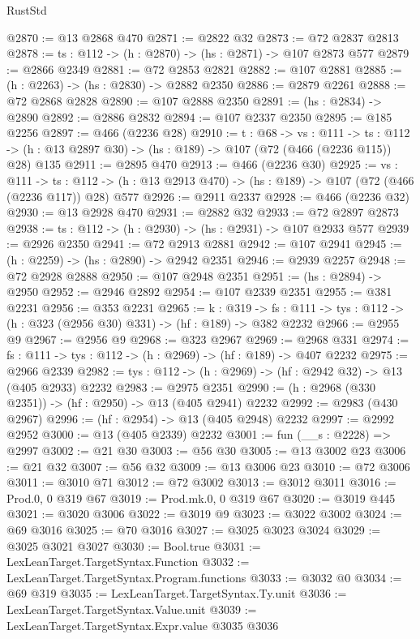 \begin{lexlean}{RustStd}
\begin{coremodule}
{\begin{coremodule}
{{{{@2870 := @13 @2868 @470
@2871 := @2822 @32
@2873 := @72 @2837 @2813
@2878 := {ts : @112} -> (h : @2870) -> (hs : @2871) -> @107 @2873 @577
@2879 := @2866 @2349
@2881 := @72 @2853 @2821
@2882 := @107 @2881
@2885 := (h : @2263) -> (hs : @2830) -> @2882 @2350
@2886 := @2879 @2261
@2888 := @72 @2868 @2828
@2890 := @107 @2888 @2350
@2891 := (hs : @2834) -> @2890
@2892 := @2886 @2832
@2894 := @107 @2337 @2350
@2895 := @185 @2256
@2897 := @466 (@2236 @28)
@2910 := {t : @68} ->
  {vs : @111} ->
  {ts : @112} -> (h : @13 @2897 @30) -> (hs : @189) -> @107 (@72 (@466 (@2236 @115)) @28) @135
@2911 := @2895 @470
@2913 := @466 (@2236 @30)
@2925 := {vs : @111} ->
  {ts : @112} -> (h : @13 @2913 @470) -> (hs : @189) -> @107 (@72 (@466 (@2236 @117)) @28) @577
@2926 := @2911 @2337
@2928 := @466 (@2236 @32)
@2930 := @13 @2928 @470
@2931 := @2882 @32
@2933 := @72 @2897 @2873
@2938 := {ts : @112} -> (h : @2930) -> (hs : @2931) -> @107 @2933 @577
@2939 := @2926 @2350
@2941 := @72 @2913 @2881
@2942 := @107 @2941
@2945 := (h : @2259) -> (hs : @2890) -> @2942 @2351
@2946 := @2939 @2257
@2948 := @72 @2928 @2888
@2950 := @107 @2948 @2351
@2951 := (hs : @2894) -> @2950
@2952 := @2946 @2892
@2954 := @107 @2339 @2351
@2955 := @381 @2231
@2956 := @353 @2231
@2965 := {k : @319} ->
  {fs : @111} -> {tys : @112} -> (h : @323 (@2956 @30) @331) -> (hf : @189) -> @382 @2232
@2966 := @2955 @9
@2967 := @2956 @9
@2968 := @323 @2967
@2969 := @2968 @331
@2974 := {fs : @111} -> {tys : @112} -> (h : @2969) -> (hf : @189) -> @407 @2232
@2975 := @2966 @2339
@2982 := {tys : @112} -> (h : @2969) -> (hf : @2942 @32) -> @13 (@405 @2933) @2232
@2983 := @2975 @2351
@2990 := (h : @2968 (@330 @2351)) -> (hf : @2950) -> @13 (@405 @2941) @2232
@2992 := @2983 (@430 @2967)
@2996 := (hf : @2954) -> @13 (@405 @2948) @2232
@2997 := @2992 @2952
@3000 := @13 (@405 @2339) @2232
@3001 := fun (__s : @2228) => @2997
@3002 := @21 @30
@3003 := @56 @30
@3005 := @13 @3002 @23
@3006 := @21 @32
@3007 := @56 @32
@3009 := @13 @3006 @23
@3010 := @72 @3006
@3011 := @3010 @71
@3012 := @72 @3002
@3013 := @3012 @3011
@3016 := Prod.{0, 0} @319 @67
@3019 := Prod.mk.{0, 0} @319 @67
@3020 := @3019 @445
@3021 := @3020 @3006
@3022 := @3019 @9
@3023 := @3022 @3002
@3024 := @69 @3016
@3025 := @70 @3016
@3027 := @3025 @3023 @3024
@3029 := @3025 @3021 @3027
@3030 := Bool.true
@3031 := LexLeanTarget.TargetSyntax.Function
@3032 := LexLeanTarget.TargetSyntax.Program.functions
@3033 := @3032 @0
@3034 := @69 @319
@3035 := LexLeanTarget.TargetSyntax.Ty.unit
@3036 := LexLeanTarget.TargetSyntax.Value.unit
@3039 := LexLeanTarget.TargetSyntax.Expr.value @3035 @3036
}}}}
\end{coremodule}}
\end{coremodule}
\end{lexlean}
